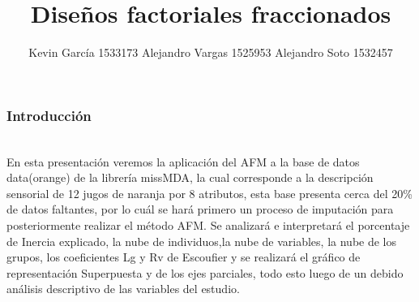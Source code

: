 \documentclass[12pt]{beamer}
\author[Kevin - Alejandro x2]{Kevin García 1533173 \newline Alejandro Vargas 1525953 \newline Alejandro Soto 1532457}
\title[Diseños factoriales fraccionados]{Diseños factoriales fraccionados}
\begin{document}
\justifying
\begin{frame}[plain]
\maketitle
\end{frame}


\begin{frame}
\frametitle{Introducción}
~\\En esta presentación veremos la aplicación del AFM a la base de datos data(orange) de la librería missMDA, la cual corresponde a la descripción sensorial de 12 jugos de naranja por 8 atributos, esta base presenta cerca del 20\% de datos faltantes, por lo cuál se hará primero un proceso de imputación para posteriormente realizar el método AFM. Se analizará e interpretará el porcentaje de Inercia explicado, la nube de individuos,la nube de variables, la nube de los grupos, los coeficientes Lg y Rv de Escoufier y se realizará el gráfico de representación Superpuesta y de los ejes parciales, todo esto luego de un debido análisis descriptivo de las variables del estudio.
\end{frame}
\end{document}
